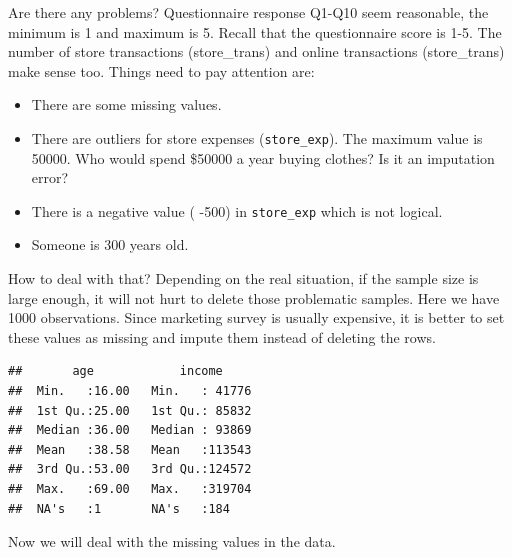 \documentclass[12pt,]{krantz}
\newenvironment{Shaded}{\begin{snugshade}}{\end{snugshade}}
\newcommand{\KeywordTok}[1]{\textcolor[rgb]{0.13,0.29,0.53}{\textbf{{#1}}}}
\newcommand{\DataTypeTok}[1]{\textcolor[rgb]{0.13,0.29,0.53}{{#1}}}
\newcommand{\DecValTok}[1]{\textcolor[rgb]{0.00,0.00,0.81}{{#1}}}
\newcommand{\StringTok}[1]{\textcolor[rgb]{0.31,0.60,0.02}{{#1}}}
\newcommand{\CommentTok}[1]{\textcolor[rgb]{0.56,0.35,0.01}{\textit{{#1}}}}
\newcommand{\OtherTok}[1]{\textcolor[rgb]{0.56,0.35,0.01}{{#1}}}
\newcommand{\NormalTok}[1]{{#1}}
\providecommand{\tightlist}{%
  \setlength{\itemsep}{0pt}\setlength{\parskip}{0pt}}
\theoremstyle{definition}
\theoremstyle{definition}
\theoremstyle{remark}
\begin{document}
Are there any problems? Questionnaire response Q1-Q10 seem reasonable,
the minimum is 1 and maximum is 5. Recall that the questionnaire score
is 1-5. The number of store transactions (store\_trans) and online
transactions (store\_trans) make sense too. Things need to pay attention
are:

\begin{itemize}
\tightlist
\item
  There are some missing values.
\item
  There are outliers for store expenses (\texttt{store\_exp}). The
  maximum value is 50000. Who would spend \$50000 a year buying clothes?
  Is it an imputation error?
\item
  There is a negative value ( -500) in \texttt{store\_exp} which is not
  logical.
\item
  Someone is 300 years old.
\end{itemize}

How to deal with that? Depending on the real situation, if the sample
size is large enough, it will not hurt to delete those problematic
samples. Here we have 1000 observations. Since marketing survey is
usually expensive, it is better to set these values as missing and
impute them instead of deleting the rows.

\begin{Shaded}
\end{Shaded}

\begin{verbatim}
##       age            income      
##  Min.   :16.00   Min.   : 41776  
##  1st Qu.:25.00   1st Qu.: 85832  
##  Median :36.00   Median : 93869  
##  Mean   :38.58   Mean   :113543  
##  3rd Qu.:53.00   3rd Qu.:124572  
##  Max.   :69.00   Max.   :319704  
##  NA's   :1       NA's   :184
\end{verbatim}

Now we will deal with the missing values in the data.
\end{document}
